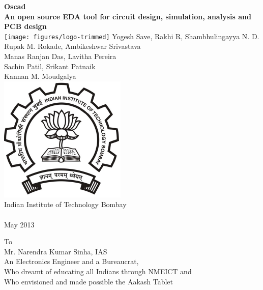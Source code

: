 \begin{center}
{\bf {\Huge Oscad} \\ [0.1in]
\LARGE An open source EDA tool for circuit design,
  simulation, analysis and PCB design} \\
\vfill
\texttt{[image: figures/logo-trimmed]}
\vfill
%
Yogesh Save, Rakhi R, Shambhulingayya N. D. \\
Rupak M. Rokade, Ambikeshwar Srivastava \\
Manas Ranjan Das, Lavitha Pereira  \\
Sachin Patil, Srikant Patnaik \\ 
Kannan M. Moudgalya \\ 
\vfill
\includegraphics[width=0.2\linewidth]{iitblogo} \\
Indian Institute of Technology Bombay \\ [2mm]
{\LARGE \byncnd} \\ [1mm]
May 2013
\end{center}


\cleardoublepage

\null\vspace{2.25in}
\begin{center}
To \\ [2mm]
{\large Mr. Narendra Kumar Sinha, IAS \\
An Electronics Engineer and a Bureaucrat, \\
Who dreamt of educating all Indians through NMEICT and \\
Who envisioned and made possible the Aakash Tablet
}
\end{center}
\vfill
\cleardoublepage